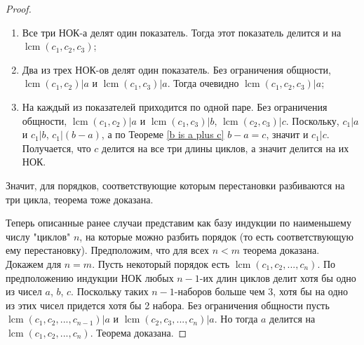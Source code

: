 \documentclass[12pt]{article}
\DeclareMathOperator{\lcm}{lcm}
\begin{document}
\begin{proof}
		\begin{enumerate}
			\item Все три НОК-а делят один показатель. Тогда этот показатель делится и на $\lcm(c_1, c_2, c_3)$;
			\item Два из трех НОК-ов делят один показатель. Без ограничения общности, $\lcm(c_1, c_2) | a$ и $\lcm(c_1, c_3) | a$. Тогда очевидно $\lcm(c_1, c_2, c_3) | a$;
			\item На каждый из показателей приходится по одной паре. Без ограничения общности, $\lcm(c_1, c_2) | a$ и $\lcm(c_1, c_3) | b$, $\lcm(c_2, c_3) | c$. Поскольку, $c_1 | a$ и $c_1 | b$, $c_1 | (b-a)$, а по Теореме \ref{b is a plus c} $b-a = c$, значит и $c_1 | c$. Получается, что $c$ делится на все три длины циклов, а значит делится на их НОК. 
		\end{enumerate}
		Значит, для порядков, соответствующие которым перестановки разбиваются на три цикла, теорема тоже доказана.
		
		Теперь описанные ранее случаи представим как базу индукции по наименьшему числу "циклов" $n$, на которые можно разбить порядок (то есть соответствующую ему перестановку).
		Предположим, что для всех  $n < m$ теорема доказана. Докажем для $n=m$. Пусть некоторый порядок есть $\lcm(c_1, c_2, ..., c_n)$. По предположению индукции НОК любых $n-1$-их длин циклов делит хотя бы одно из чисел $a$, $b$, $c$. Поскольку таких $n-1$-наборов больше чем 3, хотя бы на одно из этих чисел придется хотя бы 2 набора. Без ограничения общности пусть $\lcm(c_1, c_2, ..., c_{n-1}) | a$ и $\lcm(c_2, c_3, ..., c_n) | a$. Но тогда $a$ делится на $\lcm(c_1, c_2, ..., c_n)$. Теорема доказана.
	\end{proof}
\end{document}
